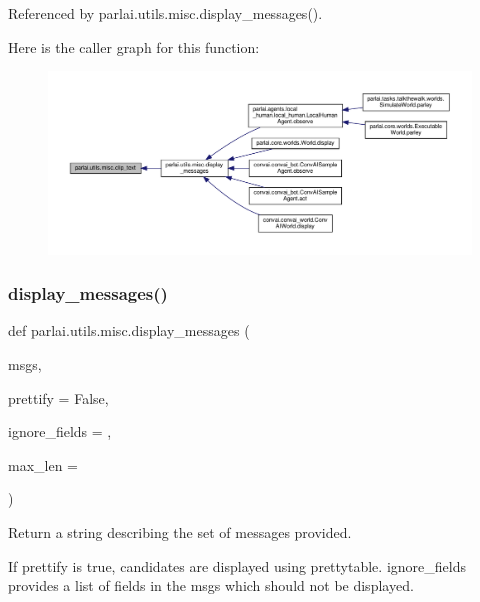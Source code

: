 Referenced by parlai.\+utils.\+misc.\+display\+\_\+messages().

Here is the caller graph for this function\+:
\nopagebreak
\begin{figure}[H]
\begin{center}
\leavevmode
\includegraphics[width=350pt]{namespaceparlai_1_1utils_1_1misc_a219b248f4399036a381ca859aa97433e_icgraph}
\end{center}
\end{figure}
\mbox{\label{namespaceparlai_1_1utils_1_1misc_a146f303a4c4b34993458968c74b55d2f}} 
\subsubsection{\texorpdfstring{display\+\_\+messages()}{display\_messages()}}
{\footnotesize\ttfamily def parlai.\+utils.\+misc.\+display\+\_\+messages (\begin{DoxyParamCaption}\item[{}]{msgs,  }\item[{}]{prettify = {\ttfamily False},  }\item[{}]{ignore\+\_\+fields = {\ttfamily \textquotesingle{}\textquotesingle{}},  }\item[{}]{max\+\_\+len = {} }\end{DoxyParamCaption})}

\begin{DoxyVerb}Return a string describing the set of messages provided.

If prettify is true, candidates are displayed using prettytable.
ignore_fields provides a list of fields in the msgs which should not be
displayed.
\end{DoxyVerb}
 

